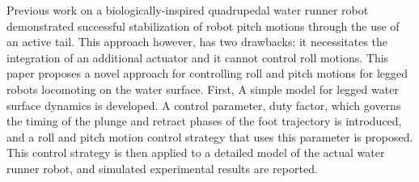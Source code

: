 Previous work on a biologically-inspired quadrupedal water runner robot demonstrated successful stabilization of robot pitch motions through the use of an active tail. This approach however, has two drawbacks: it necessitates the integration of an additional actuator and  it cannot control roll motions. This paper proposes a novel approach for controlling roll and pitch motions for legged robots locomoting on the water surface. First, A simple model for legged water surface dynamics is developed. A control parameter, duty factor, which governs the timing of the plunge and retract phases of the foot trajectory is introduced, and a roll and pitch motion control strategy that uses this parameter is proposed. This control strategy is then applied to a detailed model of the actual water runner robot, and simulated experimental results are reported.
